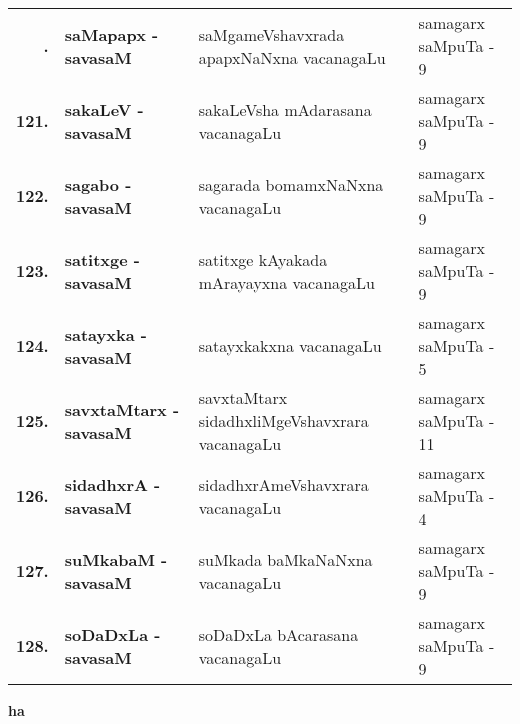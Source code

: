 {\renewcommand{\arraystretch}{1.3}
\begin{longtable}{>{\bf}r>{\bf}l>{\raggedright}p{8cm}l}
\endfirsthead
\endhead
\endfoot
\endlastfoot
120. & saMapapx - savasaM &  saMgameVshavxrada apapxNaNxna vacanagaLu & samagarx saMpuTa - 9\\
121. & sakaLeV - savasaM & sakaLeVsha mAdarasana vacanagaLu & samagarx saMpuTa - 9 \\
122. & sagabo - savasaM & sagarada bomamxNaNxna vacanagaLu & samagarx saMpuTa - 9 \\
123. & satitxge - savasaM & satitxge kAyakada mArayayxna vacanagaLu & samagarx saMpuTa - 9 \\
124. & satayxka - savasaM & satayxkakxna vacanagaLu & samagarx saMpuTa - 5 \\
125. & savxtaMtarx - savasaM &  savxtaMtarx sidadhxliMgeVshavxrara vacanagaLu & samagarx saMpuTa - 11 \\
126. & sidadhxrA - savasaM & sidadhxrAmeVshavxrara vacanagaLu & samagarx saMpuTa - 4 \\
127. & suMkabaM - savasaM & suMkada baMkaNaNxna vacanagaLu & samagarx saMpuTa - 9 \\
128. & soDaDxLa - savasaM &  soDaDxLa bAcarasana vacanagaLu & samagarx saMpuTa - 9
\end{longtable}}
\smallskip

\centerline{\bf ha}

